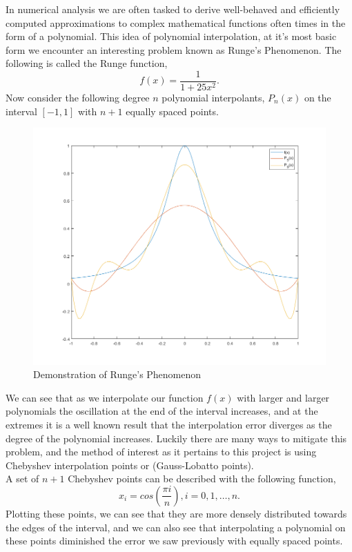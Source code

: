 \documentclass[12pt]{article}
\theoremstyle{homework}
\begin{document}
 In numerical analysis we are often tasked to derive well-behaved and efficiently computed 
approximations to complex mathematical functions often times in the form of a polynomial. This idea of polynomial interpolation, at it's most basic form
we encounter an interesting problem known as Runge's Phenomenon. The following is called the Runge function,
\begin{equation*}
  f(x) = \dfrac{1}{1 + 25x^2}.
\end{equation*}  
Now consider the following degree $n$ polynomial interpolants, $P_n(x)$ on the interval $[-1,1]$ with $n+1$ equally spaced points. 
\begin{figure}[H]
  \caption{Demonstration of Runge's Phenomenon}
  \includegraphics[width = \textwidth]{runge_example.png}  
  \centering
\end{figure}
We can see that as we interpolate our function $f(x)$ with larger and larger polynomials the oscillation at the end of 
the interval increases, and at the extremes it is a well known result that the interpolation error diverges as the degree
of the polynomial increases. Luckily there are many ways to mitigate this problem, and the method of interest as it pertains to this project is 
using Chebyshev interpolation points or (Gauss-Lobatto points). \\

 A set of $n+1$ Chebyshev points can be described with the following function, 
 \begin{equation*}
   x_i = cos(\dfrac{\pi i}{n}), i = 0, 1, \dots, n.
 \end{equation*}
 Plotting these points, we can see that they are more densely distributed towards the edges of the interval, and we can also see that
 interpolating a polynomial on these points diminished the error we saw previously with equally spaced points.
\end{document}
